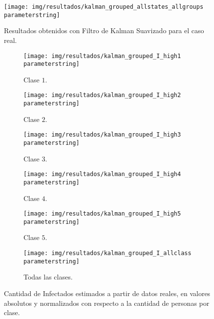 \begin{figure}[h]
\centering
\texttt{[image: img/resultados/kalman\_grouped\_allstates\_allgroups\\parameterstring]}
\caption{Resultados obtenidos con Filtro de Kalman Suavizado para el caso real.}
\label{all-nohigh}
\end{figure}



\begin{figure}
     \centering
     \begin{subfigure}[b]{0.47\textwidth}
         \centering
         \texttt{[image: img/resultados/kalman\_grouped\_I\_high1\\parameterstring]}
         \caption{Clase \(1\).}
     \end{subfigure}
     \hfill
     \begin{subfigure}[b]{.47\textwidth}
         \centering
         \texttt{[image: img/resultados/kalman\_grouped\_I\_high2\\parameterstring]}
         \caption{Clase \(2\).}
     \end{subfigure}
     \hfill
     \begin{subfigure}[b]{.47\textwidth}
         \centering
         \texttt{[image: img/resultados/kalman\_grouped\_I\_high3\\parameterstring]}
         \caption{Clase \(3\).}
     \end{subfigure}
     \hfill
     \begin{subfigure}[b]{.47\textwidth}
         \centering
         \texttt{[image: img/resultados/kalman\_grouped\_I\_high4\\parameterstring]}
         \caption{Clase \(4\).}
     \end{subfigure}
     \hfill
     \begin{subfigure}[b]{.47\textwidth}
         \centering
         \texttt{[image: img/resultados/kalman\_grouped\_I\_high5\\parameterstring]}
         \caption{Clase \(5\).}
     \end{subfigure}
     \hfill
     \begin{subfigure}[b]{.47\textwidth}
         \centering
         \texttt{[image: img/resultados/kalman\_grouped\_I\_allclass\\parameterstring]}
         \caption{Todas las clases.}
     \end{subfigure}
        \caption{Cantidad de Infectados estimados a partir de datos reales, en valores absolutos y normalizados con respecto a la cantidad de personas por clase.}
        \label{e-comp-high}
\end{figure}



